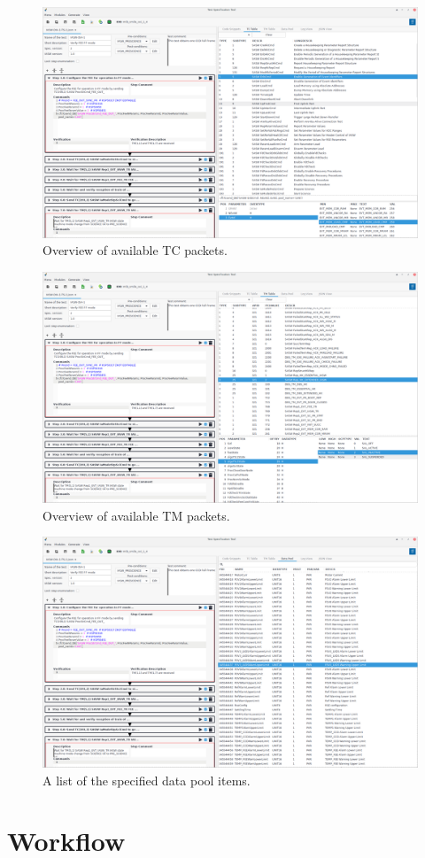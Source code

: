 \begin{figure}\label{fig:tctab}
\includegraphics[width=1.\textwidth]{../shared/images/tctab.png} 
\caption{Overview of available TC packets.}
\end{figure}

\begin{figure}\label{fig:tmtab}
\includegraphics[width=1.\textwidth]{../shared/images/tmtab.png} 
\caption{Overview of available TM packets.}
\end{figure}

\begin{figure}\label{fig:tstdp}
\includegraphics[width=1.\textwidth]{../shared/images/datapool.png} 
\caption{A list of the specified data pool items.}
\end{figure}


\section{Workflow}


